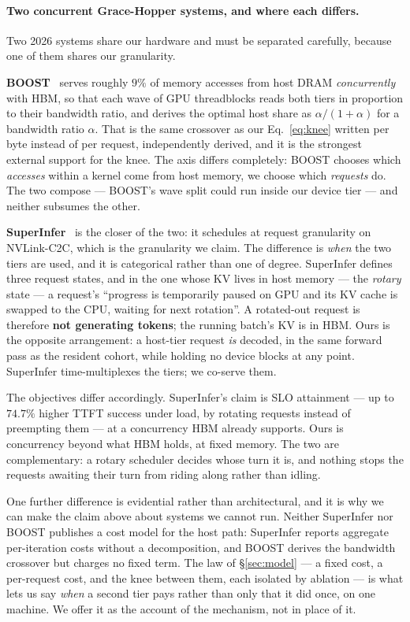 \paragraph{Two concurrent Grace-Hopper systems, and where each differs.}
Two 2026 systems share our hardware and must be separated carefully, because one
of them shares our granularity.

\textbf{BOOST}~\cite{boost} serves roughly $9\%$ of memory accesses from host DRAM
\emph{concurrently} with HBM, so that each wave of GPU threadblocks reads both tiers
in proportion to their bandwidth ratio, and derives the optimal host share as
$\alpha/(1{+}\alpha)$ for a bandwidth ratio $\alpha$. That is the same crossover as
our Eq.~\ref{eq:knee} written per byte instead of per request, independently
derived, and it is the strongest external support for the knee. The axis differs
completely: BOOST chooses which \emph{accesses} within a kernel come from host
memory, we choose which \emph{requests} do. The two compose --- BOOST's wave split
could run inside our device tier --- and neither subsumes the other.

\textbf{SuperInfer}~\cite{superinfer} is the closer of the two: it schedules at
request granularity on NVLink-C2C, which is the granularity we claim. The
difference is \emph{when} the two tiers are used, and it is categorical rather than
one of degree. SuperInfer defines three request states, and in the one whose KV
lives in host memory --- the \emph{rotary} state --- a request's ``progress is
temporarily paused on GPU and its KV cache is swapped to the CPU, waiting for next
rotation''. A rotated-out request is therefore \textbf{not generating tokens}; the
running batch's KV is in HBM. Ours is the opposite arrangement: a host-tier request
\emph{is} decoded, in the same forward pass as the resident cohort, while holding
no device blocks at any point. SuperInfer time-multiplexes the tiers; we co-serve
them.

The objectives differ accordingly. SuperInfer's claim is SLO attainment --- up to
$74.7\%$ higher TTFT success under load, by rotating requests instead of preempting
them --- at a concurrency HBM already supports. Ours is concurrency beyond what HBM
holds, at fixed memory. The two are complementary: a rotary scheduler decides whose
turn it is, and nothing stops the requests awaiting their turn from riding along
rather than idling.

One further difference is evidential rather than architectural, and it is why we can
make the claim above about systems we cannot run. Neither SuperInfer nor BOOST
publishes a cost model for the host path: SuperInfer reports aggregate
per-iteration costs without a decomposition, and BOOST derives the bandwidth
crossover but charges no fixed term. The law of \S\ref{sec:model} --- a fixed cost,
a per-request cost, and the knee between them, each isolated by ablation --- is what
lets us say \emph{when} a second tier pays rather than only that it did once, on one
machine. We offer it as the account of the mechanism, not in place of it.

